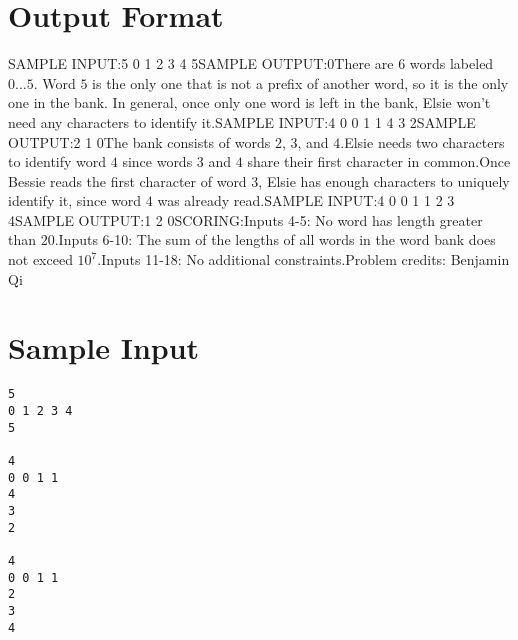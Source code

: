 \documentclass[12pt]{article}
\begin{document}
\section*{Output Format}
SAMPLE INPUT:5
0 1 2 3 4
5SAMPLE OUTPUT:0There are $6$ words labeled $0\dots 5$. Word $5$ is the only one that is not  a
prefix of another word, so it is the only one in the bank. In general, once only
one word is left in the bank, Elsie won't need any characters to identify it.SAMPLE INPUT:4
0 0 1 1
4
3
2SAMPLE OUTPUT:2
1
0The bank consists of words $2$, $3$, and $4$.Elsie needs two characters to identify word $4$ since words $3$ and $4$ share
their first character in common.Once Bessie reads the first character of word $3$, Elsie has enough characters
to uniquely identify it, since word $4$ was already read.SAMPLE INPUT:4
0 0 1 1
2
3
4SAMPLE OUTPUT:1
2
0SCORING:Inputs 4-5: No word has length greater than $20$.Inputs 6-10: The sum of the lengths of all words in the word bank does not
exceed
$10^7$.Inputs 11-18: No additional constraints.Problem credits: Benjamin Qi

\section*{Sample Input}
\begin{verbatim}
5
0 1 2 3 4
5

4
0 0 1 1
4
3
2

4
0 0 1 1
2
3
4
\end{verbatim}
\end{document}
